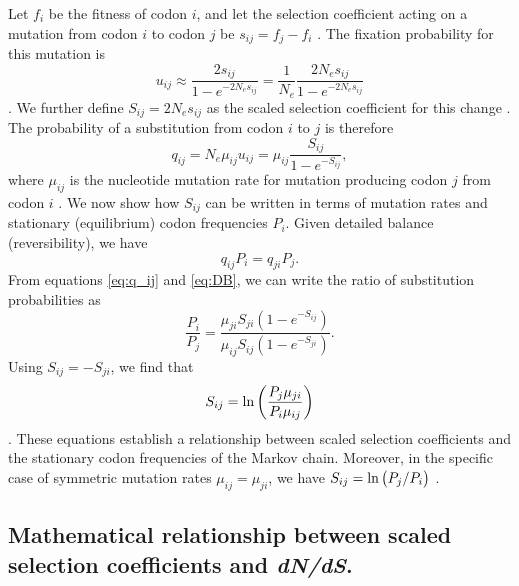 \documentclass[11pt]{article}
\begin{document}
Let $f_i$ be the fitness of codon $i$, and let the selection coefficient acting on a mutation from codon $i$ to codon $j$ be $s_{ij} = f_j - f_i$ \cite{SellaHirsh2005,YangNielsen2008}. The fixation probability for this mutation is 
\begin{equation}\label{eq:u_ij}
u_{ij} \approx \frac{2s_{ij}}{1 - e^{-2N_es_{ij}}} = \frac{1}{N_e}\frac{2N_es_{ij}}{1 - e^{-2N_es_{ij}}}
\end{equation} \cite{Kimura1962,HalpernBruno1998,YangNielsen2008}. We further define $S_{ij} = 2N_es_{ij}$ as the scaled selection coefficient for this change \cite{YangNielsen2008}. The probability of a substitution from codon $i$ to $j$ is therefore
\begin{equation}\label{eq:q_ij}
q_{ij} = N_e\mu_{ij}u_{ij} = \mu_{ij}\frac{S_{ij}}{1 - e^{-S_{ij}}} , 
\end{equation} where $\mu_{ij}$ is the nucleotide mutation rate for mutation producing codon $j$ from codon $i$ \cite{HalpernBruno1998,SellaHirsh2005}.
We now show how $S_{ij}$ can be written in terms of mutation rates and stationary (equilibrium) codon frequencies $P_i$. Given detailed balance (reversibility), we have 
\begin{equation}\label{eq:DB}
q_{ij}P_i = q_{ji}P_j .
\end{equation} From equations \eqref{eq:q_ij} and \eqref{eq:DB}, we can write the ratio of substitution probabilities as 
\begin{equation}\label{ratio_q_ij}
\frac{P_i}{P_j} = \frac{\mu_{ji} S_{ji} (1-e^{-S_{ij}})} {\mu_{ij} S_{ij} (1-e^{-S_{ji}})} .
\end{equation} Using $S_{ij} = -S_{ji}$, we find that
\begin{equation}\label{eq:s_pmu}
S_{ij} = \ln\bigg{(} \frac{P_j\mu_{ji}}{P_i\mu_{ij}} \bigg{)} 
\end{equation} \cite{HalpernBruno1998}. These equations establish a relationship between scaled selection coefficients and the stationary codon frequencies of the Markov chain. Moreover, in the specific case of symmetric mutation rates $\mu_{ij} = \mu_{ji}$, we have $S_{ij} = \ln\big{(}P_j/P_i\big{)}$ \cite{SellaHirsh2005}. 


		
\subsection*{Mathematical relationship between scaled selection coefficients and \emph{dN/dS}.} 
\end{document}
